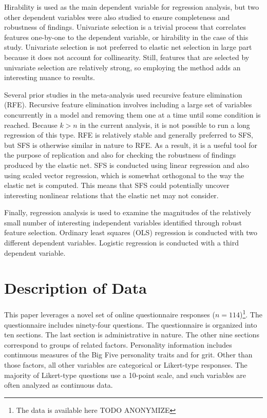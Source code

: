 \documentclass[review]{elsarticle}
\begin{document}
Hirability is used as the main dependent variable for regression analysis,
but two other dependent variables were also studied to ensure completeness and robustness of findings.
Univariate selection is a trivial process that correlates features one-by-one to the dependent variable,
or hirability in the case of this study.
Univariate selection is not preferred to elastic net selection in large part because it does not account for collinearity.
Still, features that are selected by univariate selection are relatively strong, so employing the method adds an interesting nuance to results.

Several prior studies in the meta-analysis used recursive feature elimination (RFE).
Recursive feature elimination involves including a large set of variables concurrently in a model and removing them one at a time
until some condition is reached.
Because $k > n$ in the current analysis, it is not possible to run a long regression of this type.
RFE is relatively stable and generally preferred to SFS, but SFS is otherwise similar in nature to RFE.
As a result, it is a useful tool for the purpose of replication and also for checking the robustness of findings produced by the elastic net.
SFS is conducted using linear regression and also using scaled vector regression, which is somewhat orthogonal to the way the elastic net is computed.
This means that SFS could potentially uncover interesting nonlinear relations that the elastic net may not consider.

Finally, regression analysis is used to examine the magnitudes of the relatively small
number of interesting independent variables identified through robust feature selection.
Ordinary least squares (OLS) regression is conducted with two different dependent variables.
Logistic regression is conducted with a third dependent variable.


\section{Description of Data}

This paper leverages a novel set of online questionnaire responses ($n = 114$)\footnote{
    The data is available here TODO ANONYMIZE
}.
The questionnaire includes ninety-four questions.
The questionnaire is organized into ten sections.
The last section is administrative in nature.
The other nine sections correspond to groups of related factors.
Personality information includes continuous measures of the Big Five personality traits and for grit.
Other than those factors, all other variables are categorical or Likert-type responses.
The majority of Likert-type questions use a 10-point scale, and such variables are often analyzed as continuous data.
\end{document}
